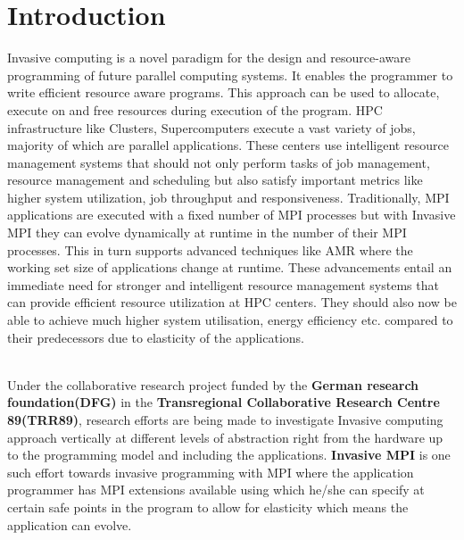 \chapter{Introduction}\label{chapter:introduction}
Invasive computing is a novel paradigm for the design and resource-aware programming of future parallel computing systems. It enables the programmer to write efficient resource aware programs. This approach can be used to allocate, execute on and free resources during execution of the program. HPC infrastructure like Clusters, Supercomputers execute a vast variety of jobs, majority of which are parallel applications. These centers use intelligent resource management systems that should not only perform tasks of job management, resource management and scheduling but also satisfy important metrics like higher system utilization, job throughput and responsiveness. Traditionally, MPI applications are executed with a fixed number of MPI processes but with Invasive MPI they can evolve dynamically at runtime in the number of their MPI processes. This in turn supports advanced techniques like AMR where the working set size of applications change at runtime. These advancements entail an immediate need for stronger and intelligent resource management systems that can provide efficient resource utilization at HPC centers. They should also now be able to achieve much higher system utilisation, energy efficiency etc. compared to their predecessors due to elasticity of the applications.\par
\noindent
\\Under the collaborative research project funded by the \textbf{German research foundation(DFG)} in the \textbf{Transregional Collaborative Research Centre 89(TRR89)}, research efforts are being made to investigate Invasive computing approach vertically at different levels of abstraction right from the hardware up to the programming model and including the applications. \textbf{Invasive MPI} is one such effort towards invasive programming with MPI where the application programmer has MPI extensions available using which he/she can specify at certain safe points in the program to allow for elasticity which means the application can evolve.\par
